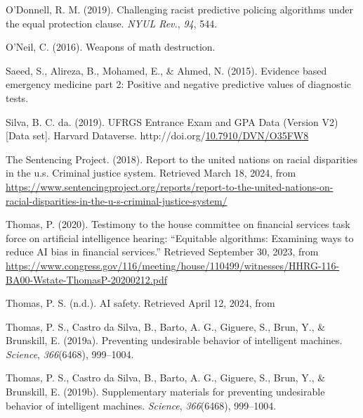 \documentclass[12pt, twoside]{amherstthesis}
\newenvironment{CSLReferences}[2]%
  {}%
  {\par}
\begin{document}
\begin{CSLReferences}{1}{0}
\leavevmode{}%
O'Donnell, R. M. (2019). Challenging racist predictive policing algorithms under the equal protection clause. \emph{NYUL Rev.}, \emph{94}, 544.

\leavevmode{}%
O'Neil, C. (2016). Weapons of math destruction.

\leavevmode{}%
Saeed, S., Alireza, B., Mohamed, E., \& Ahmed, N. (2015). Evidence based emergency medicine part 2: Positive and negative predictive values of diagnostic tests.

\leavevmode{}%
Silva, B. C. da. (2019). {UFRGS Entrance Exam and GPA Data} (Version V2) {[}Data set{]}. Harvard Dataverse. http://doi.org/\href{https://doi.org/10.7910/DVN/O35FW8}{10.7910/DVN/O35FW8}

\leavevmode{}%
The Sentencing Project. (2018). Report to the united nations on racial disparities in the u.s. Criminal justice system. Retrieved March 18, 2024, from \url{https://www.sentencingproject.org/reports/report-to-the-united-nations-on-racial-disparities-in-the-u-s-criminal-justice-system/}

\leavevmode{}%
Thomas, P. (2020). Testimony to the house committee on financial services task force on artificial intelligence hearing: {``Equitable algorithms: Examining ways to reduce AI bias in financial services.''} Retrieved September 30, 2023, from \url{https://www.congress.gov/116/meeting/house/110499/witnesses/HHRG-116-BA00-Wstate-ThomasP-20200212.pdf}

\leavevmode{}%
Thomas, P. S. (n.d.). AI safety. Retrieved April 12, 2024, from

\leavevmode{}%
Thomas, P. S., Castro da Silva, B., Barto, A. G., Giguere, S., Brun, Y., \& Brunskill, E. (2019a). Preventing undesirable behavior of intelligent machines. \emph{Science}, \emph{366}(6468), 999--1004.

\leavevmode{}%
Thomas, P. S., Castro da Silva, B., Barto, A. G., Giguere, S., Brun, Y., \& Brunskill, E. (2019b). Supplementary materials for preventing undesirable behavior of intelligent machines. \emph{Science}, \emph{366}(6468), 999--1004.

\end{CSLReferences}
\end{document}
